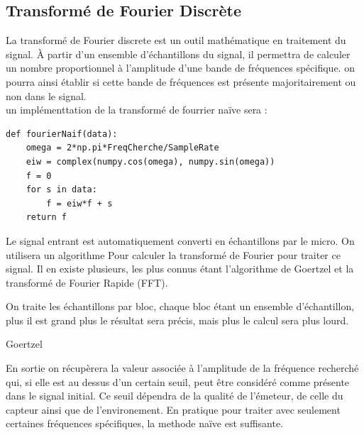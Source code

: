 \documentclass[12pt]{article}
\begin{document}
\subsection{Transformé de Fourier Discrète}
La transformé de Fourier discrete est un outil mathématique en traitement du signal. À partir d'un ensemble d'échantillons du signal, il permettra de calculer un nombre proportionnel à l'amplitude d'une bande de fréquences spécifique. on pourra ainsi établir si cette bande de fréquences est présente majoritairement ou non dans le signal.\\

un implémenttation de la transformé de fourrier naïve sera :
\begin{verbatim}
def fourierNaif(data):
	omega = 2*np.pi*FreqCherche/SampleRate
    eiw = complex(numpy.cos(omega), numpy.sin(omega))
    f = 0
    for s in data:
        f = eiw*f + s
    return f
\end{verbatim}

Le signal entrant est automatiquement converti en échantillons par le micro. On utilisera un algorithme Pour calculer la transformé de Fourier pour traiter ce signal. Il en existe plusieurs, les plus connus étant l'algorithme de Goertzel et la transformé de Fourier Rapide (FFT).

On traite les échantillons par bloc, chaque bloc étant un ensemble d'échantillon, plus il est grand plus le résultat sera précis, mais plus le calcul sera plus lourd.
\begin{algorithm}[H]
\caption{Goertzel}
\begin{algorithmic}
\ENDFOR
{}
\end{algorithmic}
\end{algorithm}

En sortie on récupèrera la valeur associée à l'amplitude de la fréquence recherché qui, si elle est au dessus d'un certain seuil, peut être considéré comme présente dans le signal initial. Ce seuil dépendra de la qualité de l'émeteur, de celle du capteur ainsi que de l'environement.
En pratique pour traiter avec seulement certaines fréquences spécifiques, la methode naïve est suffisante.
\end{document}

